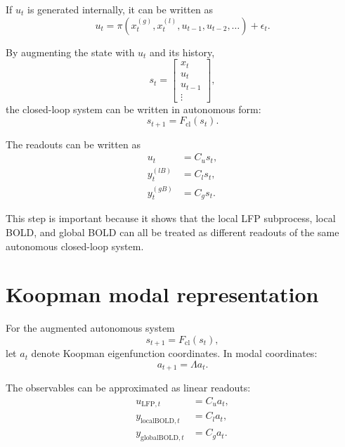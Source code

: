 \documentclass[11pt,a4paper]{article}
\begin{document}
If $u_t$ is generated internally, it can be written as
\begin{equation}
    u_t = \pi\!\left(x_t^{(g)}, x_t^{(l)}, u_{t-1},u_{t-2},\ldots\right)+\epsilon_t.
\end{equation}

By augmenting the state with $u_t$ and its history,
\begin{equation}
    s_t = \begin{bmatrix}
    x_t \\
    u_t \\
    u_{t-1} \\
    \vdots
    \end{bmatrix},
\end{equation}
the closed-loop system can be written in autonomous form:
\begin{equation}
    s_{t+1}=F_{\mathrm{cl}}(s_t).
\end{equation}

The readouts can be written as
\begin{align}
    u_t &= C_u s_t, \\
    y_t^{(lB)} &= C_l s_t, \\
    y_t^{(gB)} &= C_g s_t.
\end{align}

This step is important because it shows that the local LFP subprocess, local BOLD, and global BOLD can all be treated as different readouts of the same autonomous closed-loop system.

\section{Koopman modal representation}

For the augmented autonomous system
\begin{equation}
    s_{t+1}=F_{\mathrm{cl}}(s_t),
\end{equation}
let $a_t$ denote Koopman eigenfunction coordinates. In modal coordinates:
\begin{equation}
    a_{t+1}=\Lambda a_t.
\end{equation}

The observables can be approximated as linear readouts:
\begin{align}
    u_{\mathrm{LFP},t}&=C_u a_t, \\
    y_{\mathrm{localBOLD},t}&=C_l a_t, \\
    y_{\mathrm{globalBOLD},t}&=C_g a_t.
\end{align}
\end{document}
